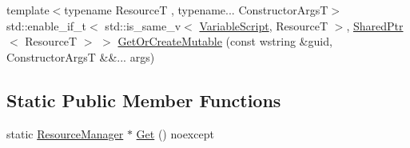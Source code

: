 \begin{DoxyCompactItemize}
\item 
{\footnotesize template$<$typename ResourceT , typename... Constructor\+ArgsT$>$ }\\std\+::enable\+\_\+if\+\_\+t$<$ std\+::is\+\_\+same\+\_\+v$<$ \hyperlink{classmage_1_1_variable_script}{Variable\+Script}, ResourceT $>$, \hyperlink{namespacemage_a1e01ae66713838a7a67d30e44c67703e}{Shared\+Ptr}$<$ ResourceT $>$ $>$ \hyperlink{classmage_1_1_resource_manager_aeda7b180772c301cce2e795869944c5f}{Get\+Or\+Create\+Mutable} (const wstring \&guid, Constructor\+ArgsT \&\&... args)
\end{DoxyCompactItemize}
\subsection*{Static Public Member Functions}
\begin{DoxyCompactItemize}
\item 
static \hyperlink{classmage_1_1_resource_manager}{Resource\+Manager} $\ast$ \hyperlink{classmage_1_1_resource_manager_a1e6ca77d892578fc4df0e62dfbc807f6}{Get} () noexcept
\end{DoxyCompactItemize}
